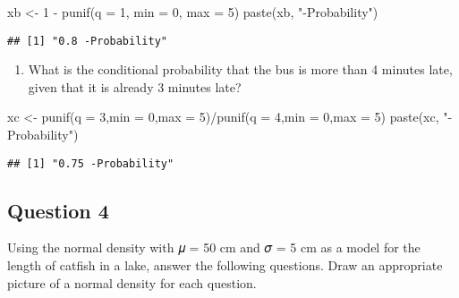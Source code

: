 \documentclass[
]{article}
\newenvironment{Shaded}{\begin{snugshade}}{\end{snugshade}}
\newcommand{\AttributeTok}[1]{\textcolor[rgb]{0.77,0.63,0.00}{#1}}
\newcommand{\DecValTok}[1]{\textcolor[rgb]{0.00,0.00,0.81}{#1}}
\newcommand{\FunctionTok}[1]{\textcolor[rgb]{0.00,0.00,0.00}{#1}}
\newcommand{\NormalTok}[1]{#1}
\newcommand{\OtherTok}[1]{\textcolor[rgb]{0.56,0.35,0.01}{#1}}
\newcommand{\SpecialCharTok}[1]{\textcolor[rgb]{0.00,0.00,0.00}{#1}}
\newcommand{\StringTok}[1]{\textcolor[rgb]{0.31,0.60,0.02}{#1}}
\providecommand{\tightlist}{%
  \setlength{\itemsep}{0pt}\setlength{\parskip}{0pt}}
\begin{document}
\begin{Shaded}
\begin{Highlighting}[]
\NormalTok{xb }\OtherTok{\textless{}{-}} \DecValTok{1} \SpecialCharTok{{-}} \FunctionTok{punif}\NormalTok{(}\AttributeTok{q =} \DecValTok{1}\NormalTok{, }\AttributeTok{min =} \DecValTok{0}\NormalTok{, }\AttributeTok{max =} \DecValTok{5}\NormalTok{)}
\FunctionTok{paste}\NormalTok{(xb, }\StringTok{"{-}Probability"}\NormalTok{)}
\end{Highlighting}
\end{Shaded}

\begin{verbatim}
## [1] "0.8 -Probability"
\end{verbatim}

\begin{enumerate}
\def\labelenumi{\alph{enumi}.}
\setcounter{enumi}{2}
\tightlist
\item
  What is the conditional probability that the bus is more than 4
  minutes late, given that it is already 3 minutes late?
\end{enumerate}

\begin{Shaded}
\begin{Highlighting}[]
\NormalTok{xc }\OtherTok{\textless{}{-}} \FunctionTok{punif}\NormalTok{(}\AttributeTok{q =} \DecValTok{3}\NormalTok{,}\AttributeTok{min =} \DecValTok{0}\NormalTok{,}\AttributeTok{max =} \DecValTok{5}\NormalTok{)}\SpecialCharTok{/}\FunctionTok{punif}\NormalTok{(}\AttributeTok{q =} \DecValTok{4}\NormalTok{,}\AttributeTok{min =} \DecValTok{0}\NormalTok{,}\AttributeTok{max =} \DecValTok{5}\NormalTok{)}
\FunctionTok{paste}\NormalTok{(xc, }\StringTok{"{-}Probability"}\NormalTok{)}
\end{Highlighting}
\end{Shaded}

\begin{verbatim}
## [1] "0.75 -Probability"
\end{verbatim}

\hypertarget{question-4}{%
\subsection{Question 4}\label{question-4}}

Using the normal density with 𝜇 = 50 cm and 𝜎 = 5 cm as a model for the
length of catfish in a lake, answer the following questions. Draw an
appropriate picture of a normal density for each question.
\end{document}
